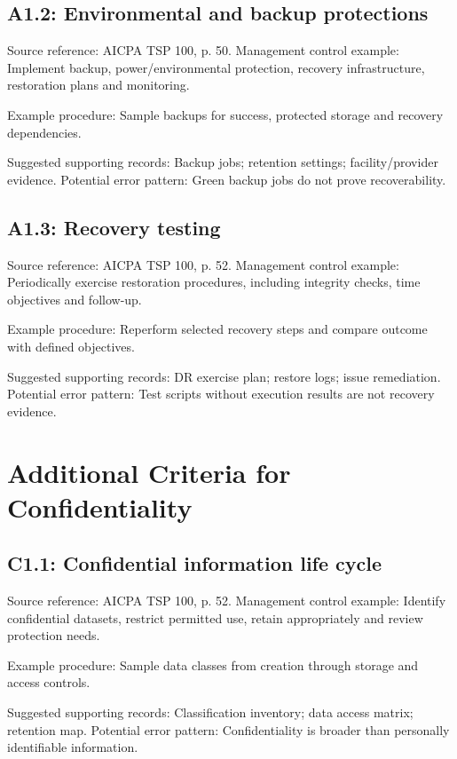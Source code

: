 \documentclass[10pt,oneside]{report}
\begin{document}
\subsection*{A1.2: Environmental and backup protections}
Source reference: AICPA TSP 100, p. 50. Management control example: Implement backup, power/environmental protection, recovery infrastructure, restoration plans and monitoring.

Example procedure: Sample backups for success, protected storage and recovery dependencies.

Suggested supporting records: Backup jobs; retention settings; facility/provider evidence. Potential error pattern: Green backup jobs do not prove recoverability.

\subsection*{A1.3: Recovery testing}
Source reference: AICPA TSP 100, p. 52. Management control example: Periodically exercise restoration procedures, including integrity checks, time objectives and follow-up.

Example procedure: Reperform selected recovery steps and compare outcome with defined objectives.

Suggested supporting records: DR exercise plan; restore logs; issue remediation. Potential error pattern: Test scripts without execution results are not recovery evidence.

\section{Additional Criteria for Confidentiality}
\subsection*{C1.1: Confidential information life cycle}
Source reference: AICPA TSP 100, p. 52. Management control example: Identify confidential datasets, restrict permitted use, retain appropriately and review protection needs.

Example procedure: Sample data classes from creation through storage and access controls.

Suggested supporting records: Classification inventory; data access matrix; retention map. Potential error pattern: Confidentiality is broader than personally identifiable information.
\end{document}
